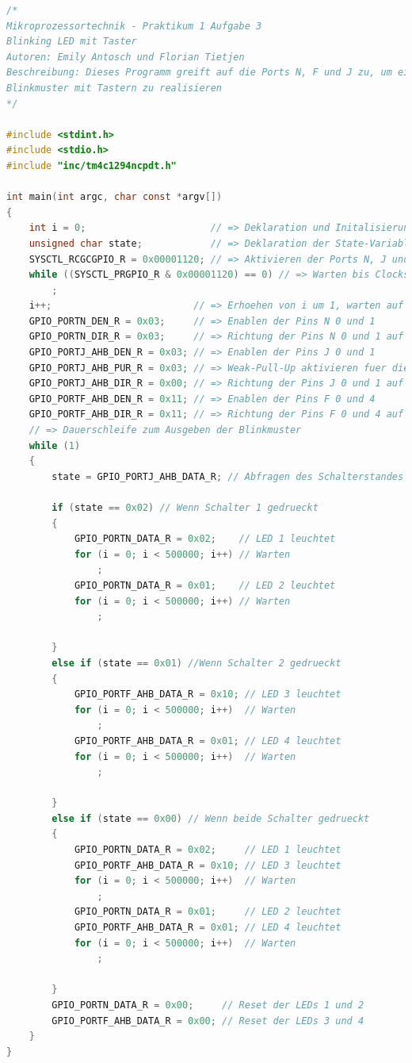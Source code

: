 \documentclass{article}
\begin{document}
\begin{lstlisting}[language=c, caption={Code für das Blinkmuster mit Taster}, captionpos=b]
/*
Mikroprozessortechnik - Praktikum 1 Aufgabe 3
Blinking LED mit Taster
Autoren: Emily Antosch und Florian Tietjen
Beschreibung: Dieses Programm greift auf die Ports N, F und J zu, um ein
Blinkmuster mit Tastern zu realisieren
*/

#include <stdint.h>
#include <stdio.h>
#include "inc/tm4c1294ncpdt.h"

int main(int argc, char const *argv[])
{
    int i = 0;                      // => Deklaration und Initalisierung der Warte-Variable i
    unsigned char state;            // => Deklaration der State-Variable zum Abfragen des Schalterstandes
    SYSCTL_RCGCGPIO_R = 0x00001120; // => Aktivieren der Ports N, J und F
    while ((SYSCTL_PRGPIO_R & 0x00001120) == 0) // => Warten bis Clocksignal anliegt
        ;
    i++;                         // => Erhoehen von i um 1, warten auf Clock
    GPIO_PORTN_DEN_R = 0x03;     // => Enablen der Pins N 0 und 1
    GPIO_PORTN_DIR_R = 0x03;     // => Richtung der Pins N 0 und 1 auf Ausgang
    GPIO_PORTJ_AHB_DEN_R = 0x03; // => Enablen der Pins J 0 und 1
    GPIO_PORTJ_AHB_PUR_R = 0x03; // => Weak-Pull-Up aktivieren fuer die Pins J 0 und 1
    GPIO_PORTJ_AHB_DIR_R = 0x00; // => Richtung der Pins J 0 und 1 auf Eingang
    GPIO_PORTF_AHB_DEN_R = 0x11; // => Enablen der Pins F 0 und 4
    GPIO_PORTF_AHB_DIR_R = 0x11; // => Richtung der Pins F 0 und 4 auf Ausgang
    // => Dauerschleife zum Ausgeben der Blinkmuster
    while (1)
    {
        state = GPIO_PORTJ_AHB_DATA_R; // Abfragen des Schalterstandes

        if (state == 0x02) // Wenn Schalter 1 gedrueckt
        {
            GPIO_PORTN_DATA_R = 0x02;    // LED 1 leuchtet
            for (i = 0; i < 500000; i++) // Warten
                ;
            GPIO_PORTN_DATA_R = 0x01;    // LED 2 leuchtet
            for (i = 0; i < 500000; i++) // Warten
                ;

        }
        else if (state == 0x01) //Wenn Schalter 2 gedrueckt
        {
            GPIO_PORTF_AHB_DATA_R = 0x10; // LED 3 leuchtet
            for (i = 0; i < 500000; i++)  // Warten
                ;
            GPIO_PORTF_AHB_DATA_R = 0x01; // LED 4 leuchtet
            for (i = 0; i < 500000; i++)  // Warten
                ;

        }
        else if (state == 0x00) // Wenn beide Schalter gedrueckt
        {
            GPIO_PORTN_DATA_R = 0x02;     // LED 1 leuchtet
            GPIO_PORTF_AHB_DATA_R = 0x10; // LED 3 leuchtet
            for (i = 0; i < 500000; i++)  // Warten
                ;
            GPIO_PORTN_DATA_R = 0x01;     // LED 2 leuchtet
            GPIO_PORTF_AHB_DATA_R = 0x01; // LED 4 leuchtet
            for (i = 0; i < 500000; i++)  // Warten
                ;

        }
        GPIO_PORTN_DATA_R = 0x00;     // Reset der LEDs 1 und 2
        GPIO_PORTF_AHB_DATA_R = 0x00; // Reset der LEDs 3 und 4
    }
}

  
\end{lstlisting}
\end{document}
